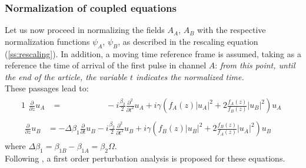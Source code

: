 \documentclass[8pt]{beamer} %
\begin{document}
\begin{frame}
    \frametitle{Normalization of coupled equations}
    Let us now proceed in normalizing the fields $A_A$, $A_B$ with the respective normalization functions $\psi_A$, $\psi_B$, as described in the rescaling equation (\ref{ss:rescaling}).
    In addition, a moving time reference frame is assumed, taking as a reference the time of arrival of the first pulse in channel $A$: \textit{from this point, until the end of the article, the variable $t$ indicates the normalized time.}\\
    These passages lead to:
    \begin{alignat}{1}\label{eq:u}
        \begin{aligned}
            \frac{\partial}{\partial z} u_A & = \qquad \qquad \quad \; - i \frac{\beta_2}{2} \frac{\partial^2}{\partial t^2} u_A + i \gamma \left(f_A(z)|u_A|^2 + 2 \frac{f_A(z)}{f_B(z)} |u_B|^2 \right)u_A
        \end{aligned} \\
        \begin{aligned}
            \frac{\partial}{\partial z} u_B & = - \Delta \beta_1 \frac{\partial}{\partial t} u_B - i \frac{\beta_2}{2} \frac{\partial^2}{\partial t^2} u_B + i \gamma \left(f_B(z)|u_B|^2 +2 \frac{f_B(z)}{f_A(z)}|u_A|^2\right)u_B
        \end{aligned}
    \end{alignat}
    where $\Delta \beta_1 = \beta_{1B} - \beta_{1A} = \beta_2 \Omega$. \\
    Following \cite{Dar_2013}, a first order perturbation analysis is proposed for these equations.

\end{frame}
\end{document}
